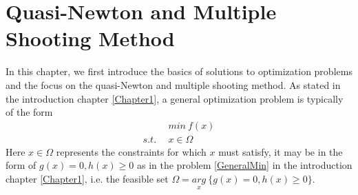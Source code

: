 \chapter{Quasi-Newton and Multiple Shooting Method}
In this chapter, we first introduce the basics of solutions to optimization problems and the focus on the quasi-Newton and multiple shooting method. 
As stated in the introduction chapter \ref{Chapter1}, a general optimization problem is typically of the form 
\begin{equation}
	\begin{aligned}
		\  \  \ & min \  f(x) \\
		s.t.\ \  & x \in \Omega
	\end{aligned}
	\label{OptGen}
\end{equation}
Here $x \in \Omega$ represents the constraints for which $x$ must satisfy, it may be in the form of $ g(x) = 0,  h(x)  \geq  0$ as in the problem \ref{GeneralMin} in the introduction chapter \ref{Chapter1}, i.e. the feasible set $\Omega = \underset{x}{arg} \ \{ g(x) = 0,  h(x)  \geq  0 \}$. 

